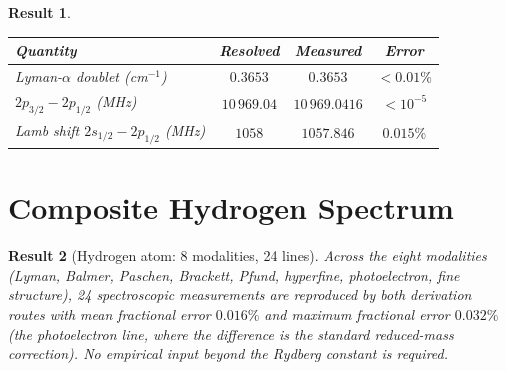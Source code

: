 \documentclass[11pt,a4paper]{article}
\theoremstyle{stmtstyle}
\newtheorem{result}{Result}
\theoremstyle{definition}
\theoremstyle{remark}
\begin{document}
\begin{result}\label{res:fs_h}
\begin{center}\small
\begin{tabular}{lccc}
\toprule
Quantity & Resolved & Measured & Error\\
\midrule
Lyman-$\alpha$ doublet (cm$^{-1}$)   & $0.3653$ & $0.3653$ & $<0.01\%$\\
$2p_{3/2}-2p_{1/2}$ (MHz) & $10\,969.04$ & $10\,969.0416$ & $<10^{-5}$\\
Lamb shift $2s_{1/2}-2p_{1/2}$ (MHz) & $1058$ & $1057.846$ & $0.015\%$\\
\bottomrule
\end{tabular}
\end{center}
\end{result}

\section{Composite Hydrogen Spectrum}
\label{sec:hcomposite}

\begin{result}[Hydrogen atom: 8 modalities, 24 lines]\label{res:hcomp}
Across the eight modalities (Lyman, Balmer, Paschen, Brackett, Pfund, hyperfine, photoelectron, fine structure), 24 spectroscopic measurements are reproduced by both derivation routes with mean fractional error $0.016\%$ and maximum fractional error $0.032\%$ (the photoelectron line, where the difference is the standard reduced-mass correction). No empirical input beyond the Rydberg constant is required.
\end{result}
\end{document}
